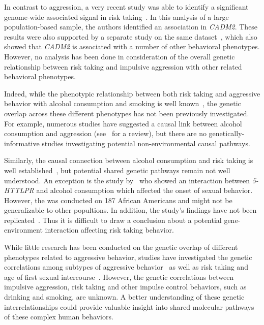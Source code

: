 In contrast to aggression, a very recent study was able to identify a significant genome-wide associated signal in risk taking~\cite{Day2016}. 
In this analysis of a large population-based sample, the authors identified an association in \textit{CADM2}.
These results were also supported by a separate study on the same dataset~\cite{Boutwell2017}, which also showed that \textit{CADM2} is associated with a number of other behavioral phenotypes.
However, no analysis has been done in consideration of the overall genetic relationship between risk taking and impulsive aggression with other related behavioral phenotypes.

Indeed, while the phenotypic relationship between both risk taking and aggressive behavior with alcohol consumption and smoking is well known~\cite{FRANZKOWIAX1987,Zuckerman2000,Dakwar2011},
the genetic overlap across these different phenotypes has not been previously investigated.
For example, numerous studies have suggested a causal link between alcohol consumption and aggression (see~\citet{Bushman1990} for a review), but there are no genetically-informative studies investigating potential non-environmental causal pathways.

Similarly, the causal connection between alcohol consumption and risk taking is well established~\cite{Lane2004}, but potential shared genetic pathways remain not well understood.
An exception is the study by~\cite{Kogan2010} who showed an interaction between \textit{5-HTTLPR} and alcohol consumption which affected the onset of sexual behavior. 
However, the was conducted on 187 African Americans and might not be generalizable to other popultions. 
In addition, the study's findings have not been replicated~\cite{Rubens2016}.
Thus it is difficult to draw a conclusion about a potential gene-environment interaction affecting risk taking behavior.

While little research has been conducted on the genetic overlap of different phenotypes related to aggressive behavior, studies have investigated the genetic correlations among subtypes of aggressive behavior~\cite{Tuvblad2011a} as well as risk taking and age of first sexual intercourse~\cite{Day2016}.
However, the genetic correlations between impulsive aggression, risk taking and other impulse control behaviors, such as drinking and smoking, are unknown.
A better understanding of these genetic interrelationships could provide valuable insight into shared molecular pathways of these complex human behaviors.

